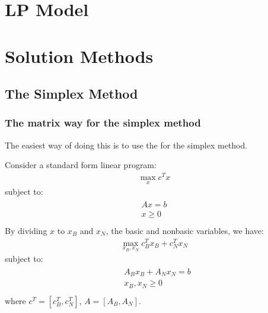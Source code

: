 \documentclass[letterpaper,10pt,english]{sphinxmanual}
\begin{document}
\section{LP Model}
\label{\detokenize{operationsResearch/LP:lp-model}}

\section{Solution Methods}
\label{\detokenize{operationsResearch/LP:solution-methods}}

\subsection{The Simplex Method}
\label{\detokenize{operationsResearch/LP:the-simplex-method}}

\subsubsection{The matrix way for the simplex method}
\label{\detokenize{operationsResearch/LP:the-matrix-way-for-the-simplex-method}}
\sphinxAtStartPar
The easiest way of doing this is to use the  for the simplex method.

\sphinxAtStartPar
Consider a standard form linear program:
\begin{equation*}
\begin{split}\max_{x} c^{T}x\end{split}
\end{equation*}
\sphinxAtStartPar
subject to:
\begin{align*}\!\begin{aligned}
Ax=b\\
x \geq 0\\
\end{aligned}\end{align*}
\sphinxAtStartPar
By dividing \(x\) to \(x_{B}\) and \(x_{N}\), the basic and non\sphinxhyphen{}basic variables,
we have:
\begin{equation*}
\begin{split}\max_{x_{B},x_{N}} c_{B}^{T}x_{B} + c_{N}^{T}x_{N}\end{split}
\end{equation*}
\sphinxAtStartPar
subject to:
\begin{align*}\!\begin{aligned}
& A_{B}x_{B} + A_{N}x_{N} = b\\
& x_{B},x_{N} \geq 0\\
\end{aligned}\end{align*}
\sphinxAtStartPar
where \(c^{T} = [c_{B}^{T},c_{N}^{T}]\), \(A=[A_{B}, A_{N}]\).
\end{document}
